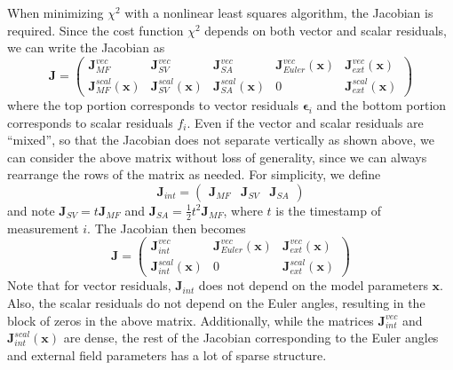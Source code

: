 \documentclass{article}
\begin{document}
When minimizing $\chi^2$ with a nonlinear least squares algorithm, the Jacobian
is required. Since the cost function $\chi^2$ depends on both vector and scalar
residuals, we can write the Jacobian as
\begin{equation}
\mathbf{J} =
\left(
\begin{array}{ccccc}
\mathbf{J}_{MF}^{vec} & \mathbf{J}_{SV}^{vec} & \mathbf{J}_{SA}^{vec} & \mathbf{J}_{Euler}^{vec}(\mathbf{x}) & \mathbf{J}_{ext}^{vec}(\mathbf{x}) \\
\mathbf{J}_{MF}^{scal}(\mathbf{x}) & \mathbf{J}^{scal}_{SV}(\mathbf{x}) & \mathbf{J}^{scal}_{SA}(\mathbf{x}) & 0 & \mathbf{J}^{scal}_{ext}(\mathbf{x})
\end{array}
\right)
\end{equation}
where the top portion corresponds to vector residuals $\boldsymbol{\epsilon}_i$ and the bottom portion
corresponds to scalar residuals $f_i$. Even if the vector and scalar residuals are ``mixed'', so that
the Jacobian does not separate vertically as shown above, we can consider the above matrix
without loss of generality, since we can always rearrange the rows of the matrix as needed.
For simplicity, we define
\begin{equation}
\mathbf{J}_{int} =
\left(
\begin{array}{ccc}
\mathbf{J}_{MF} & \mathbf{J}_{SV} & \mathbf{J}_{SA}
\end{array}
\right)
\end{equation}
and note $\mathbf{J}_{SV} = t \mathbf{J}_{MF}$ and $\mathbf{J}_{SA} = \frac{1}{2} t^2 \mathbf{J}_{MF}$,
where $t$ is the timestamp of measurement $i$. The Jacobian then becomes
\begin{equation}
\mathbf{J} =
\left(
\begin{array}{ccc}
\mathbf{J}_{int}^{vec} & \mathbf{J}_{Euler}^{vec}(\mathbf{x}) & \mathbf{J}_{ext}^{vec}(\mathbf{x}) \\
\mathbf{J}_{int}^{scal}(\mathbf{x}) & 0 & \mathbf{J}^{scal}_{ext}(\mathbf{x})
\end{array}
\right)
\end{equation}
Note that for vector residuals, $\mathbf{J}_{int}$ does not depend on the model parameters
$\mathbf{x}$. Also, the scalar residuals do not depend on the Euler angles, resulting in the
block of zeros in the above matrix. Additionally, while the matrices $\mathbf{J}_{int}^{vec}$
and $\mathbf{J}_{int}^{scal}(\mathbf{x})$ are dense, the rest of the Jacobian corresponding
to the Euler angles and external field parameters has a lot of sparse structure.
\end{document}
